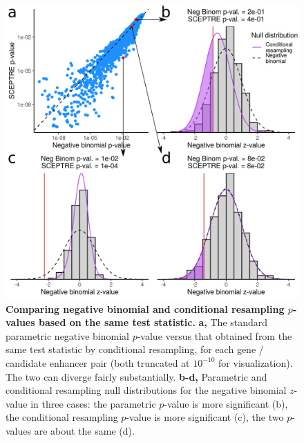 \documentclass{nature}
\begin{document}
\thispagestyle{empty} 
\begin{figure}[h!]
	\includegraphics[width = \textwidth]{figures/FigureS2/FigureS2.png}
	\caption{\textbf{Comparing negative binomial and conditional resampling $p$-values based on the same test statistic.} \textbf{a,} The standard parametric negative binomial $p$-value versus that obtained from the same test statistic by conditional resampling, for each gene / candidate enhancer pair (both truncated at $10^{-10}$ for visualization). The two can diverge fairly substantially. \textbf{b-d,} Parametric and conditional resampling null distributions for the negative binomial $z$-value in three cases: the parametric $p$-value is more significant (b), the conditional resampling $p$-value is more significant (c), the two $p$-values are about the same (d).}
	\label{fig:NB-vs-CP}
\end{figure}

\end{document}
